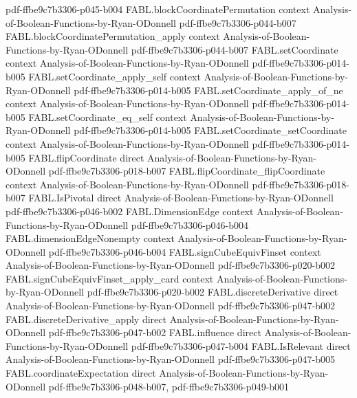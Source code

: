 \begin{theorem}
  {pdf-ffbe9c7b3306-p045-b004}
\proofstep
  {FABL.blockCoordinatePermutation}
  {context}
  {Analysis-of-Boolean-Functions-by-Ryan-ODonnell}
  {pdf-ffbe9c7b3306-p044-b007}
\proofstep
  {FABL.blockCoordinatePermutation_apply}
  {context}
  {Analysis-of-Boolean-Functions-by-Ryan-ODonnell}
  {pdf-ffbe9c7b3306-p044-b007}
\proofstep
  {FABL.setCoordinate}
  {context}
  {Analysis-of-Boolean-Functions-by-Ryan-ODonnell}
  {pdf-ffbe9c7b3306-p014-b005}
\proofstep
  {FABL.setCoordinate_apply_self}
  {context}
  {Analysis-of-Boolean-Functions-by-Ryan-ODonnell}
  {pdf-ffbe9c7b3306-p014-b005}
\proofstep
  {FABL.setCoordinate_apply_of_ne}
  {context}
  {Analysis-of-Boolean-Functions-by-Ryan-ODonnell}
  {pdf-ffbe9c7b3306-p014-b005}
\proofstep
  {FABL.setCoordinate_eq_self}
  {context}
  {Analysis-of-Boolean-Functions-by-Ryan-ODonnell}
  {pdf-ffbe9c7b3306-p014-b005}
\proofstep
  {FABL.setCoordinate_setCoordinate}
  {context}
  {Analysis-of-Boolean-Functions-by-Ryan-ODonnell}
  {pdf-ffbe9c7b3306-p014-b005}
\proofstep
  {FABL.flipCoordinate}
  {direct}
  {Analysis-of-Boolean-Functions-by-Ryan-ODonnell}
  {pdf-ffbe9c7b3306-p018-b007}
\proofstep
  {FABL.flipCoordinate_flipCoordinate}
  {context}
  {Analysis-of-Boolean-Functions-by-Ryan-ODonnell}
  {pdf-ffbe9c7b3306-p018-b007}
\proofstep
  {FABL.IsPivotal}
  {direct}
  {Analysis-of-Boolean-Functions-by-Ryan-ODonnell}
  {pdf-ffbe9c7b3306-p046-b002}
\proofstep
  {FABL.DimensionEdge}
  {context}
  {Analysis-of-Boolean-Functions-by-Ryan-ODonnell}
  {pdf-ffbe9c7b3306-p046-b004}
\proofstep
  {FABL.dimensionEdgeNonempty}
  {context}
  {Analysis-of-Boolean-Functions-by-Ryan-ODonnell}
  {pdf-ffbe9c7b3306-p046-b004}
\proofstep
  {FABL.signCubeEquivFinset}
  {context}
  {Analysis-of-Boolean-Functions-by-Ryan-ODonnell}
  {pdf-ffbe9c7b3306-p020-b002}
\proofstep
  {FABL.signCubeEquivFinset_apply_card}
  {context}
  {Analysis-of-Boolean-Functions-by-Ryan-ODonnell}
  {pdf-ffbe9c7b3306-p020-b002}
\proofstep
  {FABL.discreteDerivative}
  {direct}
  {Analysis-of-Boolean-Functions-by-Ryan-ODonnell}
  {pdf-ffbe9c7b3306-p047-b002}
\proofstep
  {FABL.discreteDerivative_apply}
  {direct}
  {Analysis-of-Boolean-Functions-by-Ryan-ODonnell}
  {pdf-ffbe9c7b3306-p047-b002}
\proofstep
  {FABL.influence}
  {direct}
  {Analysis-of-Boolean-Functions-by-Ryan-ODonnell}
  {pdf-ffbe9c7b3306-p047-b004}
\proofstep
  {FABL.IsRelevant}
  {direct}
  {Analysis-of-Boolean-Functions-by-Ryan-ODonnell}
  {pdf-ffbe9c7b3306-p047-b005}
\proofstep
  {FABL.coordinateExpectation}
  {direct}
  {Analysis-of-Boolean-Functions-by-Ryan-ODonnell}
  {pdf-ffbe9c7b3306-p048-b007,
    pdf-ffbe9c7b3306-p049-b001}

\end{theorem}
